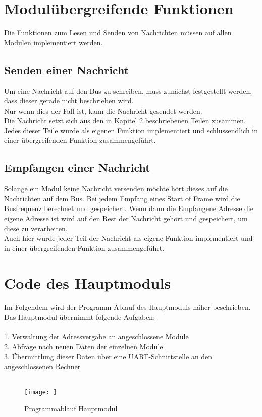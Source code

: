 \section{Modulübergreifende Funktionen}
\textmd{Die Funktionen zum Lesen und Senden von Nachrichten müssen auf allen Modulen implementiert werden.\\
}
\subsection{Senden einer Nachricht}
\textmd{Um eine Nachricht auf den Bus zu schreiben, muss zunächst festgestellt werden, dass dieser gerade nicht beschrieben wird.\\
Nur wenn dies der Fall ist, kann die Nachricht gesendet werden. \\
Die Nachricht setzt sich aus den in Kapitel \ref{} beschriebenen Teilen zusammen. Jedes dieser Teile wurde als eigenen Funktion implementiert und schlussendlich in einer übergreifenden Funktion zusammengeführt.\\
}





\subsection{Empfangen einer Nachricht}
\textmd{Solange ein Modul keine Nachricht versenden möchte hört dieses auf die Nachrichten auf dem Bus. Bei jedem Empfang eines Start of Frame wird die Busfrequenz berechnet und gespeichert. Wenn dann die Empfangene Adresse die eigene Adresse ist wird auf den Rest der Nachricht gehört und gespeichert, um diese zu verarbeiten.\\
Auch hier wurde jeder Teil der Nachricht als eigene Funktion implementiert und in einer übergreifenden Funktion zusammengeführt.
}






\section{Code des Hauptmoduls}
\textmd{Im Folgendem wird der Programm-Ablauf des Hauptmoduls näher beschrieben.\\ 
Das Hauptmodul übernimmt folgende Aufgaben:\\\\
1. Verwaltung der Adressvergabe an angeschlossene Module\\
2. Abfrage nach neuen Daten der einzelnen Module\\
3. Übermittlung dieser Daten über eine UART-Schnittstelle an den angeschlossenen Rechner\\\\ 
}
\begin{figure}[H]
    \centering    
    \texttt{[image: ]}
    \caption{Programmablauf Hauptmodul}
    \label{Programm_Hauptmodul}
\end{figure}
\textmd{
}
